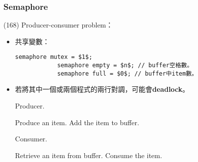 \subsubsection{Semaphore}

\begin{theorem}{(168)} Producer-consumer problem：\begin{itemize}
        \item 共享變數：\begin{lstlisting}[caption={Shared variables of Producer-consumer problem.}, captionpos=b, mathescape=true]
            semaphore mutex = $1$;
            semaphore empty = $n$; // buffer空格數。
            semaphore full = $0$; // buffer中item數。
        \end{lstlisting}
        \item 若將其中一個或兩個程式的兩行對調，可能會\textbf{deadlock}。
        \begin{algorithm}[H]
            \caption{Producer.}
            \begin{algorithmic}[1]
                    \Repeat
                        \State Produce an item.
                        \State {}
                        \State {}
                        \State Add the item to buffer.
                        \State {}
                        \State {}
                \EndFunction
            \end{algorithmic}
        \end{algorithm}
        \begin{algorithm}[H]
            \caption{Consumer.}
            \begin{algorithmic}[1]
                    \Repeat
                        \State {}
                        \State {}
                        \State Retrieve an item from buffer.
                        \State {}
                        \State {}
                        \State Consume the item.
                \EndFunction
            \end{algorithmic}
        \end{algorithm}
    \end{itemize}
\end{theorem}

